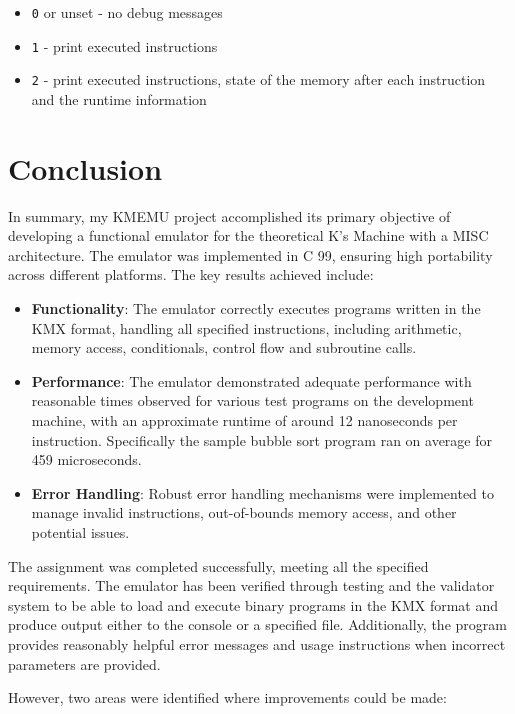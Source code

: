 \documentclass[12pt,a4paper]{paper}
\newcommand{\code}[1]{\texttt{#1}}
\begin{document}
\begin{itemize}
    \item \code{0} or unset - no debug messages
    \item \code{1} - print executed instructions
    \item \code{2} - print executed instructions, state of the memory after each
        instruction and the runtime information
\end{itemize}

\section{Conclusion}

In summary, my KMEMU project accomplished its primary objective of developing a
functional emulator for the theoretical K's Machine with a MISC architecture.
The emulator was implemented in C 99, ensuring high portability across different
platforms. The key results achieved include:

\begin{itemize}
    \item \textbf{Functionality}: The emulator correctly executes programs
        written in the KMX format, handling all specified instructions,
        including arithmetic, memory access, conditionals, control flow and
        subroutine calls.
    \item \textbf{Performance}: The emulator demonstrated adequate performance
        with reasonable times observed for various test programs on the
        development machine, with an approximate runtime of around 12
        nanoseconds per instruction. Specifically the sample bubble sort
        program ran on average for 459 microseconds.
    \item \textbf{Error Handling}: Robust error handling mechanisms were
        implemented to manage invalid instructions, out-of-bounds memory access,
        and other potential issues.
\end{itemize}

The assignment was completed successfully, meeting all the specified
requirements. The emulator has been verified through testing and the validator
system to be able to load and execute binary programs in the KMX format and
produce output either to the console or a specified file. Additionally, the
program provides reasonably helpful error messages and usage instructions when
incorrect parameters are provided.

However, two areas were identified where improvements could be made:
\end{document}
